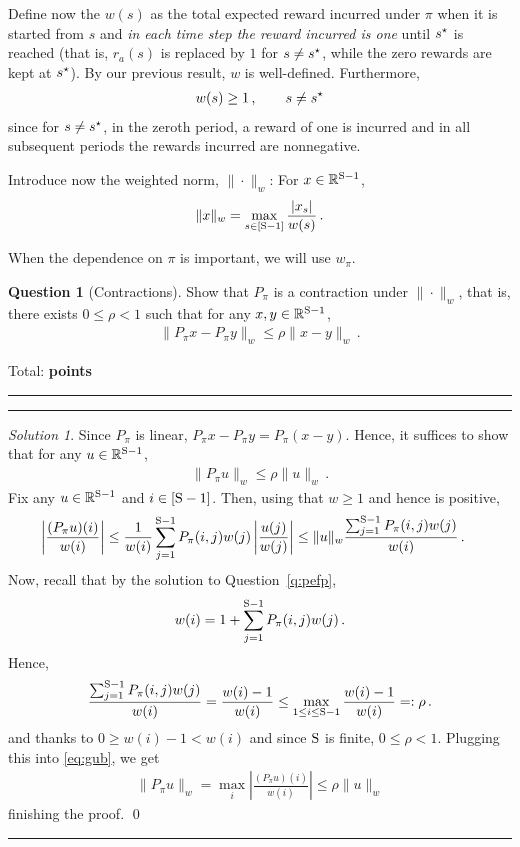 \documentclass{article}
\newcommand{\norm}[1]{\| #1 \|}
\newcommand{\R}{\mathbb{R}}
\DeclareMathOperator*{\1}{\mathbbm{1}}
\newcounter{DocPoints} %
\newcounter{QuestionPoints} %
\newcommand{\tpoints}[1]{        %
	\ifthenelse{\isempty{#1}}%
	{%
	}%
	{%
		\addtocounter{DocPoints}{#1}
		\addtocounter{QuestionPoints}{#1}
	}													 %
	\par\mbox{}\par\noindent\hfill {Total: \bf \arabic{QuestionPoints}\xspace points}\par\mbox{}\par\hrule\hrule
	\setcounter{QuestionPoints}{0}
}
\theoremstyle{definition}
\newtheorem{question}{Question}
\theoremstyle{remark}
\newtheorem*{solution*}{Solution}
\begin{document}
Define now the $w(s)$ as the total expected reward incurred under $\pi$ when it is started from $s$ and \emph{in each time step the reward incurred is one} until $s^{\star}$ is reached (that is, $r_a(s)$ is replaced by $1$ for $s\ne s^{\star}$, while the zero rewards are kept at $s^{\star}$).
By our previous result, $w$ is well-defined.
Furthermore,
\begin{align*}
w(s)\ge 1\,, \qquad s\ne s^{\star}
\end{align*}
since for $s\ne s^{\star}$, in the zeroth period, a reward of one is incurred and in all subsequent periods the rewards incurred are nonnegative.

Introduce now the weighted norm, $\norm{\cdot}_w$: For $x\in \R^{\nS-1}$,
\begin{align*}
\norm{x}_w = \max_{s\in [\nS-1]} \frac{|x_s|}{w(s)}\,.
\end{align*}

When the dependence on $\pi$ is important, we will use $w_\pi$.

\begin{question}[Contractions]
\label{q:contr}
Show that $P_\pi$ is a contraction under $\norm{\cdot}_w$, that is,
there exists $0\le \rho <1$ such that
for any $x,y\in \R^{\nS-1}$,
\begin{align*}
\norm{P_\pi x- P_\pi y}_w \le \rho \norm{x-y}_w\,.
\end{align*}
\tpoints{15}
\end{question}
\begin{solution*}
Since $P_\pi$ is linear,
$P_\pi x- P_\pi y= P_\pi(x-y)$.
Hence, it suffices to show that for any $u\in \R^{\nS-1}$,
\begin{align*}
\norm{P_\pi u}_w \le \rho \norm{u}_w\,.
\end{align*}
Fix any $u\in \R^{\nS-1}$ and $i\in [\mathrm{S}-1]$.
Then, using that $w\ge 1$ and hence is positive,
\begin{align}
\left\vert \frac{(P_\pi u)(i)}{w(i)} \right\vert
& \le
\frac{1}{w(i)}
 \sum_{j=1}^{\nS-1} P_\pi(i,j) w(j) \left\vert \frac{u(j)}{w(j)}\right\vert
 \le
\norm{u}_w \frac{\sum_{j=1}^{\nS-1} P_\pi(i,j) w(j) }{w(i)} \,.
\label{eq:gub}
\end{align}
Now, recall that by the solution to Question~\ref{q:pefp},
\begin{align*}
w(i)=1+\sum_{j=1}^{\mathrm{S}-1} P_\pi(i,j) w(j)\,.
\end{align*}
Hence,
\begin{align*}
\frac{\sum_{j=1}^{\mathrm{S}-1} P_\pi(i,j) w(j) }{w(i)} 
=
\frac{w(i)-1 }{w(i)} 
\le
\max_{1\le i \le \mathrm{S}-1} \frac{w(i)-1 }{w(i)} =:\rho\,.
\end{align*}
and thanks to $0\ge w(i)-1 <w(i)$ and since $\mathrm{S}$ is finite, $0\le \rho <1$.
Plugging this into \eqref{eq:gub}, we get 
\begin{align*}
\norm{P_\pi u}_w = \max_i \left\vert \frac{(P_\pi u)(i)}{w(i)} \right\vert
 \le
\rho \norm{u}_w 
\end{align*}
finishing the proof.
\qed\par\smallskip\hrule
\end{solution*}
\end{document}
